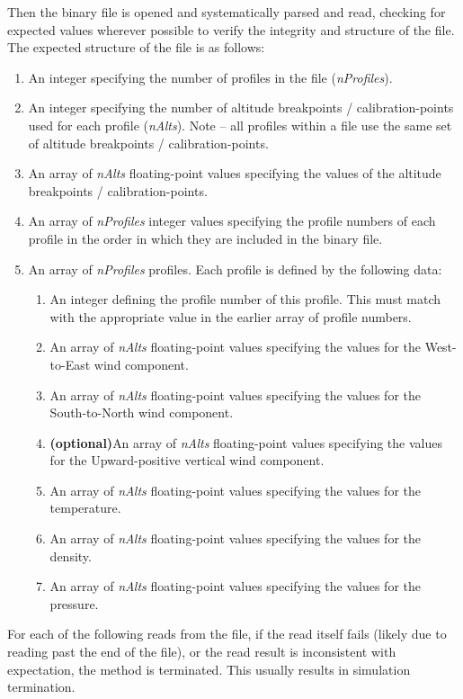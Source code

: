 \documentclass[11pt,fleqn]{report}
\begin{document}
Then the binary file is opened and systematically parsed and read, checking
for expected values wherever possible to verify the integrity and structure
of the file. The expected structure of the file is as follows:
\begin{enumerate}\label{sec:binary_read_struc}
\item An integer specifying the number of profiles in the file
  (\textit{nProfiles}).
\item An integer specifying the number of altitude breakpoints /
  calibration-points used for each profile (\textit{nAlts}). Note -- all
  profiles within a file use the same set of altitude breakpoints /
  calibration-points.
\item An array of \textit{nAlts} floating-point values specifying the values
  of the altitude breakpoints / calibration-points.
\item An array of \textit{nProfiles} integer values specifying the profile
  numbers of each profile in the order in which they are included in the
  binary file.
\item An array of \textit{nProfiles} profiles. Each profile is defined by
the following data:
  \begin{enumerate}
  \item An integer defining the profile number of this profile. This must
    match with the appropriate value in the earlier array of profile
    numbers.
  \item An array of \textit{nAlts} floating-point values specifying the
    values for the West-to-East wind component.
  \item An array of \textit{nAlts} floating-point values specifying the
    values for the South-to-North wind component.
  \item \textbf{(optional)}An array of \textit{nAlts} floating-point
    values specifying the
    values for the Upward-positive vertical wind component.
  \item An array of \textit{nAlts} floating-point values specifying the
    values for the temperature.
  \item An array of \textit{nAlts} floating-point values specifying the
    values for the density.
  \item An array of \textit{nAlts} floating-point values specifying the
    values for the pressure.
  \end{enumerate}
\end{enumerate}

For each of the following reads from the file, if the read itself fails
(likely due
to reading past the end of the file), or the read result is inconsistent with
expectation, the method is terminated. This usually results in simulation
termination.
\end{document}
